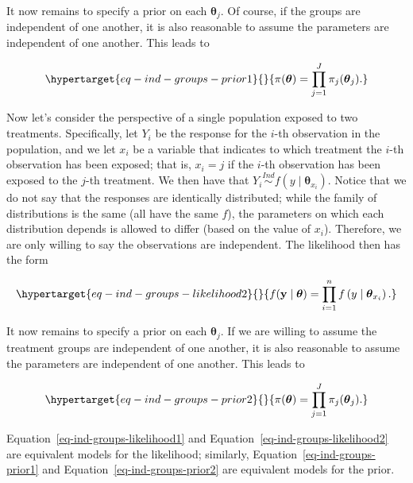 \documentclass[
  letterpaper,
  DIV=11,
  numbers=noendperiod]{scrreprt}
\theoremstyle{definition}
\theoremstyle{plain}
\theoremstyle{definition}
\theoremstyle{remark}
\begin{document}
It now remains to specify a prior on each \(\boldsymbol{\theta}_j\). Of
course, if the groups are independent of one another, it is also
reasonable to assume the parameters are independent of one another. This
leads to

\begin{equation}\protect\hypertarget{eq-ind-groups-prior1}{}{\pi(\boldsymbol{\theta}) = \prod_{j=1}^{J} \pi_j(\boldsymbol{\theta}_j).}\label{eq-ind-groups-prior1}\end{equation}

Now let's consider the perspective of a single population exposed to two
treatments. Specifically, let \(Y_i\) be the response for the \(i\)-th
observation in the population, and we let \(x_i\) be a variable that
indicates to which treatment the \(i\)-th observation has been exposed;
that is, \(x_i = j\) if the \(i\)-th observation has been exposed to the
\(j\)-th treatment. We then have that
\(Y_i \stackrel{Ind}{\sim} f\left(y \mid \boldsymbol{\theta}_{x_i}\right)\).
Notice that we do not say that the responses are identically
distributed; while the family of distributions is the same (all have the
same \(f\)), the parameters on which each distribution depends is
allowed to differ (based on the value of \(x_i\)). Therefore, we are
only willing to say the observations are independent. The likelihood
then has the form

\begin{equation}\protect\hypertarget{eq-ind-groups-likelihood2}{}{f(\mathbf{y} \mid \boldsymbol{\theta}) = \prod_{i=1}^{n} f\left(y \mid \boldsymbol{\theta}_{x_i}\right).}\label{eq-ind-groups-likelihood2}\end{equation}

It now remains to specify a prior on each \(\boldsymbol{\theta}_j\). If
we are willing to assume the treatment groups are independent of one
another, it is also reasonable to assume the parameters are independent
of one another. This leads to

\begin{equation}\protect\hypertarget{eq-ind-groups-prior2}{}{\pi(\boldsymbol{\theta}) = \prod_{j=1}^{J} \pi_j(\boldsymbol{\theta}_j).}\label{eq-ind-groups-prior2}\end{equation}

Equation~\ref{eq-ind-groups-likelihood1} and
Equation~\ref{eq-ind-groups-likelihood2} are equivalent models for the
likelihood; similarly, Equation~\ref{eq-ind-groups-prior1} and
Equation~\ref{eq-ind-groups-prior2} are equivalent models for the prior.
\end{document}

